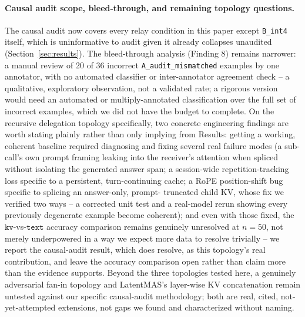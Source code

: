 \documentclass[11pt]{article}
\begin{document}
\paragraph{Causal audit scope, bleed-through, and remaining topology
questions.} The causal audit now covers every relay condition in this
paper except \texttt{B\_int4} itself, which is uninformative to audit
given it already collapses unaudited (Section~\ref{sec:results}). The
bleed-through analysis (Finding 8) remains narrower: a manual review of
20 of 36 incorrect \texttt{A\_audit\_mismatched} examples by one
annotator, with no automated classifier or inter-annotator agreement
check -- a qualitative, exploratory observation, not a validated rate; a
rigorous version would need an automated or multiply-annotated
classification over the full set of incorrect examples, which we did not
have the budget to complete. On the recursive delegation topology
specifically, two concrete engineering findings are worth stating plainly
rather than only implying from Results: getting a working, coherent
baseline required diagnosing and fixing several real failure modes (a
sub-call's own prompt framing leaking into the receiver's attention when
spliced without isolating the generated answer span; a session-wide
repetition-tracking loss specific to a persistent, turn-continuing cache;
a RoPE position-shift bug specific to splicing an answer-only, prompt-
truncated child KV, whose fix we verified two ways -- a corrected unit
test and a real-model rerun showing every previously degenerate example
become coherent); and even with those fixed, the $\texttt{kv}$-vs-$\texttt{text}$
accuracy comparison remains genuinely unresolved at $n=50$, not merely
underpowered in a way we expect more data to resolve trivially --  we
report the causal-audit result, which does resolve, as this topology's
real contribution, and leave the accuracy comparison open rather than
claim more than the evidence supports. Beyond the three topologies
tested here, a genuinely adversarial fan-in topology \citep{latentagentslie2026}
and LatentMAS's layer-wise KV concatenation \citep{latentmas2026} remain
untested against our specific causal-audit methodology; both are real,
cited, not-yet-attempted extensions, not gaps we found and
characterized without naming.
\end{document}
